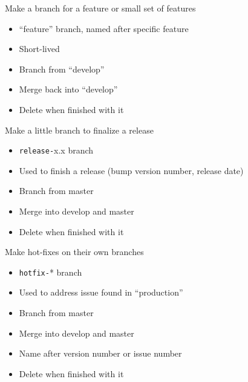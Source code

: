 \documentclass{beamer}
\begin{document}
\begin{frame}[plain]

  Make a branch for a feature or small set of features

  \begin{itemize}
  \item ``feature'' branch, named after specific feature
  \item Short-lived
  \item Branch from ``develop''
  \item Merge back into ``develop''
  \item Delete when finished with it
  \end{itemize}

\end{frame}


\begin{frame}[plain]

  Make a little branch to finalize a release

  \begin{itemize}
  \item {\tt release-}x.x branch
  \item Used to finish a release (bump version number, release date)
  \item Branch from master
  \item Merge into develop and master
  \item Delete when finished with it
  \end{itemize}

\end{frame}

\begin{frame}[plain]

  Make hot-fixes on their own branches

  \begin{itemize}
  \item {\tt hotfix-}* branch
  \item Used to address issue found in ``production''
  \item Branch from master
  \item Merge into develop and master
  \item Name after version number or issue number
  \item Delete when finished with it
  \end{itemize}

\end{frame}
\end{document}
